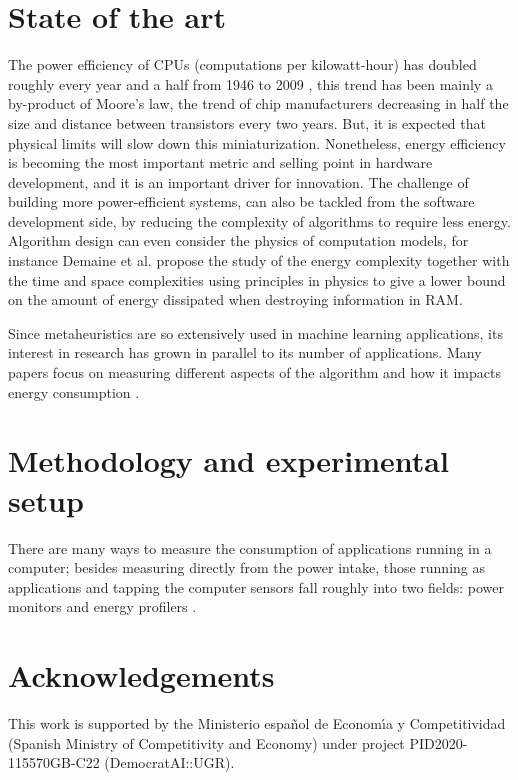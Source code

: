 \documentclass[a4paper,twoside]{article}
\begin{document}
\section{State of the art}

The power efficiency of CPUs (computations per kilowatt-hour) has doubled
roughly every year and a half from 1946 to 2009 \cite{koomey2011web}, this trend
has been mainly a by-product of Moore's law, the trend of chip manufacturers
decreasing in half the size and distance between transistors every two
years. But, it is expected that physical limits will slow down this
miniaturization. Nonetheless, energy efficiency is becoming the most important
metric and selling point in hardware development, and it is an important driver
for innovation. The challenge of building more power-efficient systems, can also
be tackled from the software development side, by reducing the complexity of
algorithms to require less energy. Algorithm design can even consider the
physics of computation models, for instance Demaine et
al. \cite{demaine2016energy} propose the study of the energy complexity together
with the time and space complexities using principles in physics to give a lower
bound on the amount of energy dissipated when destroying information in RAM.

Since metaheuristics are so extensively used in machine learning applications,
its interest in research has grown in parallel to its number of applications.
Many papers focus on measuring different aspects of the algorithm and how it
impacts energy consumption \cite{diaz2022population}.

\section{Methodology and experimental setup}
\label{sec:setup}

There are many ways to measure the consumption of applications running in a
computer; besides measuring directly from the power intake, those running as
applications and tapping the computer sensors fall roughly into two fields:
power monitors and energy profilers \cite{cruz21}.

\section*{Acknowledgements}

This work is supported by the Ministerio espa\~{n}ol de Econom\'{\i}a y
Competitividad (Spanish Ministry of Competitivity and Economy) under project
PID2020-115570GB-C22 (DemocratAI::UGR).



{\small
}
\end{document}
